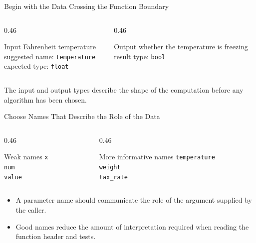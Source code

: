 \documentclass[aspectratio=169,10pt]{beamer}
\begin{document}

\begin{frame}{Begin with the Data Crossing the Function Boundary}
  \begin{columns}[T,onlytextwidth]
    \begin{column}{0.46\textwidth}
      \begin{block}{Input}
        Fahrenheit temperature\\[0.08in]
        suggested name: \texttt{temperature}\\[0.08in]
        expected type: \texttt{float}
      \end{block}
    \end{column}
    \begin{column}{0.46\textwidth}
      \begin{block}{Output}
        whether the temperature is freezing\\[0.08in]
        result type: \texttt{bool}
      \end{block}
    \end{column}
  \end{columns}

  \begin{keyidea}
    The input and output types describe the shape of the computation before any algorithm has been chosen.
  \end{keyidea}
\end{frame}

\begin{frame}{Choose Names That Describe the Role of the Data}
  \begin{columns}[T,onlytextwidth]
    \begin{column}{0.46\textwidth}
      \begin{block}{Weak names}
        \texttt{x}\\
        \texttt{num}\\
        \texttt{value}
      \end{block}
    \end{column}
    \begin{column}{0.46\textwidth}
      \begin{block}{More informative names}
        \texttt{temperature}\\
        \texttt{weight}\\
        \texttt{tax\_rate}
      \end{block}
    \end{column}
  \end{columns}

  \begin{itemize}
    \item A parameter name should communicate the role of the argument supplied by the caller.
    \item Good names reduce the amount of interpretation required when reading the function header and tests.
  \end{itemize}
\end{frame}
\end{document}
